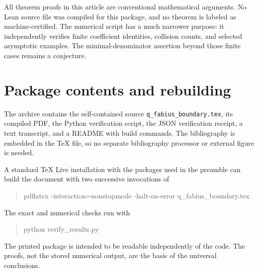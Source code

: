 \documentclass[11pt,a4paper]{article}
\numberwithin{equation}{section}
\theoremstyle{definition}
\theoremstyle{remark}
\begin{document}
All theorem proofs in this article are conventional mathematical arguments. No Lean source file was compiled for this package, and no theorem is labeled as machine-certified. The numerical script has a much narrower purpose: it independently verifies finite coefficient identities, collision counts, and selected asymptotic examples. The minimal-denominator assertion beyond those finite cases remains a conjecture.

\section{Package contents and rebuilding}
The archive contains the self-contained source \texttt{q\_fabius\_boundary.tex}, its compiled PDF, the Python verification script, the JSON verification receipt, a text transcript, and a README with build commands. The bibliography is embedded in the TeX file, so no separate bibliography processor or external figure is needed.

A standard TeX Live installation with the packages used in the preamble can build the document with two successive invocations of
\begin{quote}\ttfamily\small
pdflatex -interaction=nonstopmode -halt-on-error q\_fabius\_boundary.tex
\end{quote}
The exact and numerical checks run with
\begin{quote}\ttfamily\small
python verify\_results.py
\end{quote}
The printed package is intended to be readable independently of the code. The proofs, not the stored numerical output, are the basis of the universal conclusions.
\end{document}
